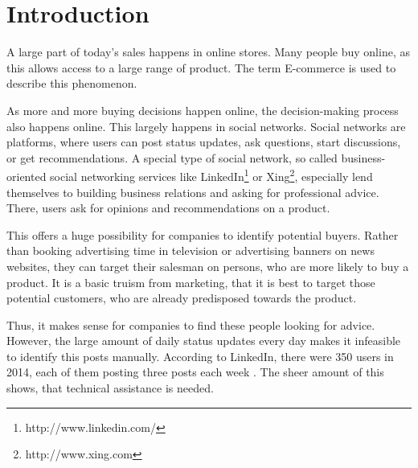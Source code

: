 

\section{Introduction}
\label{sec:introduction}

A large part of today's sales  happens in online stores.
Many people buy online, as this allows access to a large range of product.
The term E-commerce is used to describe this phenomenon.

As more and more buying decisions happen online, the decision-making process also happens online.
This largely happens in social networks.
Social networks are platforms, where users can post status updates, ask questions, start discussions, or get recommendations.
A special type of social network, so called business-oriented social networking services like LinkedIn\footnote{http://www.linkedin.com/} or Xing\footnote{http://www.xing.com}, especially lend themselves to building business relations and asking for professional advice.
There, users ask for opinions and recommendations on a product.

This offers a huge possibility for companies to identify potential buyers.
Rather than booking advertising time in television or advertising banners on news websites, they can target their salesman on persons, who are more likely to buy a product.
It is a basic truism from marketing, that it is best to target those potential customers, who are already predisposed towards the product. 

Thus, it makes sense for companies to find these people looking for advice.
However, the large amount of daily status updates every day makes it infeasible to identify this posts manually.
According to LinkedIn, there were 350 users in 2014, each of them posting three posts each week .
The sheer amount of this shows, that technical assistance is needed.

